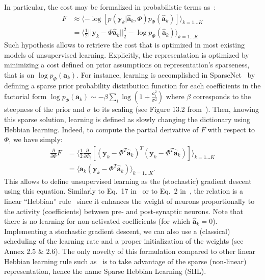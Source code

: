 \documentclass[vision,article,submit,oneauthor,pdftex]{Definitions/mdpi}
\newcommand{\coef}{\mathbf{a}} %
\newcommand{\image}{\mathbf{y}} %
\newcommand{\dico}{\Phi} %
\newcommand{\norm}[1]{|\!| #1 |\!|}
\begin{document}
In particular, the cost %
may be formalized in probabilistic terms as~\citep{Olshausen97}:
\begin{align} 
F &\approx \langle - \log [ p(\image_k | \hat{\coef}_{k}, \dico ) p_\dico(\hat{\coef}_{k}) ]\rangle_{k = 1 \ldots K} \\
&= \langle \frac{1}{2} \norm{\image_k - \dico \hat{\coef}_{k}}_2^2 - \log p_\dico(\hat{\coef}_{k})\rangle_{k = 1 \ldots K} \label{eq:sparse_cost} \end{align}
Such hypothesis allows to retrieve the cost that is optimized in most existing models of unsupervised learning. Explicitly, the representation is optimized by minimizing a cost defined on prior assumptions on representation's sparseness, that is on $\log p_\dico( \coef_{k})$. For instance, learning is accomplished in {\sc SparseNet}~\citep{Olshausen97} by defining a sparse prior probability distribution function for each coefficients in the factorial form $\log p_\dico(\coef_{k}) \sim -\beta \sum_i \log ( 1 + \frac{a_i^2}{\sigma^2} )$ where $\beta$ corresponds to the steepness of the prior and $\sigma$ to its scaling (see Figure 13.2 from~\citep{Olshausen02}). Then, knowing this sparse solution, learning is defined as slowly changing the dictionary using Hebbian learning.
Indeed, to compute the partial derivative of $F$ with respect to $\dico$, we have simply:
\begin{align} 
\frac{\partial }{\partial \dico } F &= \langle\frac{1}{2} \frac{\partial }{\partial \dico_i }[(\image_k - \dico^T \hat{\coef}_{k})^T (\image_k - \dico^T \hat{\coef}_{k})]\rangle_{k = 1 \ldots K} \\
&= \langle\hat{\coef}_{k} (\image_k - \dico^T \hat{\coef}_{k})\rangle_{k = 1 \ldots K}.
\end{align}
This allows to define unsupervised learning as the (stochastic) gradient descent using this equation. Similarly to Eq.~17 in~\citep{Olshausen97} or to Eq.~2 in~\citep{Smith06}, the relation is a linear ``Hebbian'' rule~\citep{Hebb49} since it enhances the weight of neurons proportionally to the activity (coefficients) between pre- and post-synaptic neurons. Note that there is no learning for non-activated coefficients (for which $\hat{\coef}_{k}=0$). Implementing a stochastic gradient descent, we can also use a (classical) scheduling of the learning rate and a proper initialization of the weights (see Annex 2.5 \& 2.6). The only novelty of this formulation compared to other linear Hebbian learning rule such as~\citep{Oja82} is to take advantage of the sparse (non-linear) representation, hence the name Sparse Hebbian Learning (SHL).
\end{document}
